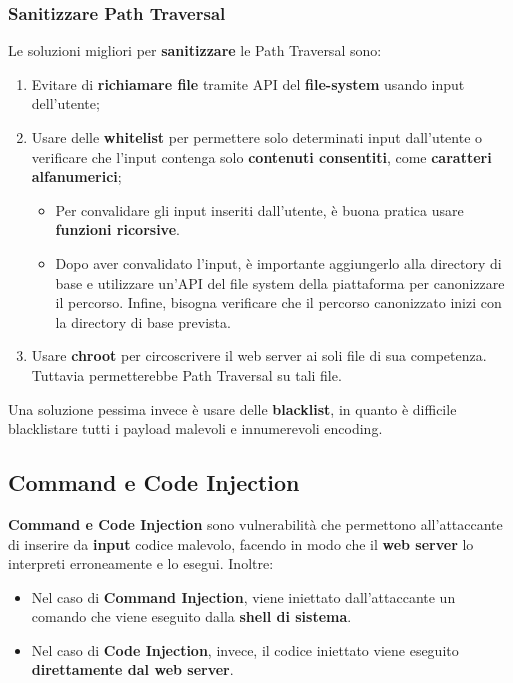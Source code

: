 \documentclass{article}
\begin{document}
\subsubsection{Sanitizzare Path Traversal}
Le soluzioni migliori per \textbf{sanitizzare} le Path Traversal sono:
\begin{enumerate}
	\item Evitare di \textbf{richiamare file} tramite API del \textbf{file-system} usando input dell'utente;
	
	\item Usare delle \textbf{whitelist} per permettere solo determinati input dall'utente o verificare che l'input contenga solo \textbf{contenuti consentiti}, come \textbf{caratteri alfanumerici};
	\begin{itemize}
		\item Per convalidare gli input inseriti dall'utente, è buona pratica usare \textbf{funzioni ricorsive}.
		
		\item Dopo aver convalidato l'input, è importante aggiungerlo alla directory di base e utilizzare un'API del file system della piattaforma per canonizzare il percorso.
		Infine, bisogna verificare che il percorso canonizzato inizi con la directory di base prevista.
	\end{itemize}
	
	\item Usare \textbf{chroot} per circoscrivere il web server ai soli file di sua competenza. Tuttavia permetterebbe Path Traversal su tali file.
\end{enumerate}

Una soluzione pessima invece è usare delle \textbf{blacklist}, in quanto è difficile blacklistare tutti i payload malevoli e innumerevoli encoding.


\subsection{Command e Code Injection}
\textbf{Command e Code Injection} sono vulnerabilità che permettono all'attaccante di inserire da \textbf{input} codice malevolo, facendo in modo che il \textbf{web server} lo interpreti erroneamente e lo esegui. Inoltre:
\begin{itemize}
	\item Nel caso di \textbf{Command Injection}, viene iniettato dall’attaccante un comando che viene eseguito dalla \textbf{shell di sistema}.
	
	\item Nel caso di \textbf{Code Injection}, invece, il codice iniettato viene eseguito \textbf{direttamente dal web
	server}.
\end{itemize}
\end{document}
